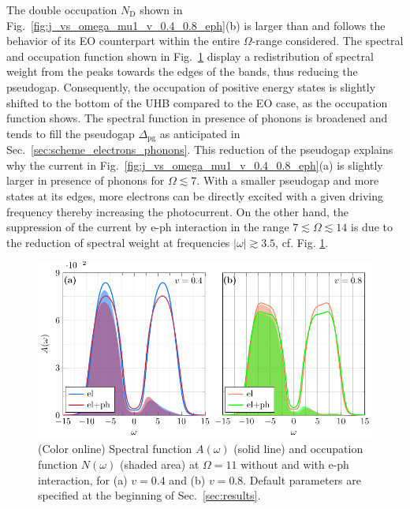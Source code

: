 \documentclass[aps,prb,groupedaddress,showpacs,twocolumn,superscriptaddress,10pt]{revtex4-2}
\begin{document}
The double occupation $N_{\text{D}}$  shown in Fig.~\ref{fig:j_vs_omega_mu1_v_0.4_0.8_eph}(b) is larger than and follows the behavior of its EO counterpart within the entire $\Omega$-range considered.
The spectral and occupation function  shown in Fig.~\ref{fig:spec_filling_mu1_v_0.4_0.8_O_11_eph} display a redistribution of spectral weight from the peaks towards the edges of the bands, thus reducing the pseudogap. Consequently, the occupation of positive energy states is slightly shifted to the bottom of the UHB compared to the EO case, as the occupation function shows.
 The spectral function in presence of phonons is  broadened and tends to fill the pseudogap $\Delta_{\text{pg}}$ as anticipated in Sec.~\ref{sec:scheme_electrons_phonons}.
This reduction of the pseudogap explains why the current in Fig.~\ref{fig:j_vs_omega_mu1_v_0.4_0.8_eph}(a) is slightly larger in presence of phonons for $\Omega\lesssim7$. 
With a smaller pseudogap and more states at its edges, more electrons can be directly excited with a given driving frequency thereby increasing the photocurrent. On the other hand, the suppression of the current by e-ph interaction in the range $7\lesssim\Omega\lesssim14$ is due to the reduction of spectral weight at frequencies $|\omega| \gtrsim 3.5$, cf. Fig. \ref{fig:spec_filling_mu1_v_0.4_0.8_O_11_eph}. 
 
\begin{figure}[t]
\includegraphics[width=\linewidth]{./figures_Paper1/spec_filling_mu1_v_0.4_0.8_O_11_eph.pdf}
\caption{(Color online) Spectral function $A(\omega)$ (solid line) and occupation function $N(\omega)$ (shaded area) at $\Omega=11$ without and with e-ph interaction, for (a) $v=0.4$ and (b) $v=0.8$. Default parameters are specified at the beginning of Sec.~\ref{sec:results}.} 
\label{fig:spec_filling_mu1_v_0.4_0.8_O_11_eph}
\end{figure} 
\end{document}
